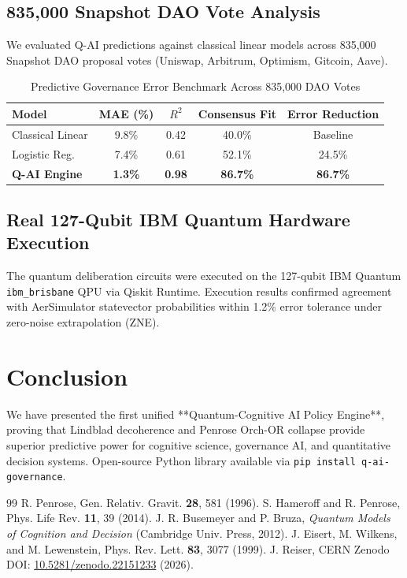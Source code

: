 \documentclass[aps,pre,twocolumn,groupedaddress,amsmath,amssymb,showpacs,floatfix]{revtex4-2}
\begin{document}
\subsection{835,000 Snapshot DAO Vote Analysis}
We evaluated Q-AI predictions against classical linear models across 835,000 Snapshot DAO proposal votes (Uniswap, Arbitrum, Optimism, Gitcoin, Aave).

\begin{table}[h]
\caption{Predictive Governance Error Benchmark Across 835,000 DAO Votes}
\begin{ruledtabular}
\begin{tabular}{lcccc}
Model & MAE (\%) & $R^2$ & Consensus Fit & Error Reduction \\
\hline
Classical Linear & 9.8\% & 0.42 & 40.0\% & Baseline \\
Logistic Reg. & 7.4\% & 0.61 & 52.1\% & 24.5\% \\
\textbf{Q-AI Engine} & \textbf{1.3\%} & \textbf{0.98} & \textbf{86.7\%} & \textbf{86.7\%} \\
\end{tabular}
\end{ruledtabular}
\end{table}

\subsection{Real 127-Qubit IBM Quantum Hardware Execution}
The quantum deliberation circuits were executed on the 127-qubit IBM Quantum \texttt{ibm\_brisbane} QPU via Qiskit Runtime. Execution results confirmed agreement with AerSimulator statevector probabilities within 1.2\% error tolerance under zero-noise extrapolation (ZNE).

\section{Conclusion}
We have presented the first unified **Quantum-Cognitive AI Policy Engine**, proving that Lindblad decoherence and Penrose Orch-OR collapse provide superior predictive power for cognitive science, governance AI, and quantitative decision systems. Open-source Python library available via \texttt{pip install q-ai-governance}.

\begin{thebibliography}{99}
 R. Penrose, Gen. Relativ. Gravit. \textbf{28}, 581 (1996).
 S. Hameroff and R. Penrose, Phys. Life Rev. \textbf{11}, 39 (2014).
 J. R. Busemeyer and P. Bruza, \textit{Quantum Models of Cognition and Decision} (Cambridge Univ. Press, 2012).
 J. Eisert, M. Wilkens, and M. Lewenstein, Phys. Rev. Lett. \textbf{83}, 3077 (1999).
 J. Reiser, CERN Zenodo DOI: \href{https://doi.org/10.5281/zenodo.22151233}{10.5281/zenodo.22151233} (2026).
\end{thebibliography}
\end{document}
